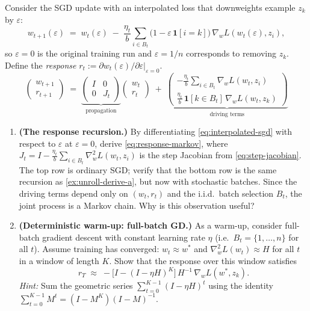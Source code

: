 \documentclass[11pt]{article}
\begin{document}
\begin{exercise}\label{ex:unroll-to-if}
Consider the SGD update with an interpolated loss that downweights example $z_k$ by $\varepsilon$:
\begin{equation}\label{eq:interpolated-sgd}
  w_{t+1}(\varepsilon) \;=\; w_t(\varepsilon) \;-\; \frac{\eta_t}{b}\sum_{i\in B_t}\bigl(1 - \varepsilon\,\mathbf{1}[i=k]\bigr)\,\nabla_w L(w_t(\varepsilon),z_i),
\end{equation}
so $\varepsilon = 0$ is the original training run and $\varepsilon = 1/n$ corresponds to removing $z_k$. Define the \emph{response} $r_t := \partial w_t(\varepsilon)/\partial\varepsilon\big|_{\varepsilon=0}$.
\begin{equation}\label{eq:response-markov}
  \begin{pmatrix} w_{t+1} \\ r_{t+1} \end{pmatrix} \;=\; \underbrace{\begin{pmatrix} I & 0 \\ 0 & J_t \end{pmatrix}}_{\text{propagation}} \begin{pmatrix} w_t \\ r_t \end{pmatrix} \;+\; \underbrace{\begin{pmatrix} -\frac{\eta_t}{b}\sum_{i\in B_t}\nabla_w L(w_t,z_i) \\[4pt] \frac{\eta_t}{b}\,\mathbf{1}[k\in B_t]\,\nabla_w L(w_t,z_k) \end{pmatrix}}_{\text{driving terms}}
\end{equation}
\begin{enumerate}
  \item \textbf{(The response recursion.)} By differentiating \eqref{eq:interpolated-sgd} with respect to $\varepsilon$ at $\varepsilon = 0$, derive \eqref{eq:response-markov}, where $J_t = I - \frac{\eta_t}{b}\sum_{i\in B_t}\nabla_w^2 L(w_t,z_i)$ is the step Jacobian from \eqref{eq:step-jacobian}. The top row is ordinary SGD; verify that the bottom row is the same recursion as \cref{ex:unroll-derive-a}, but now with stochastic batches. Since the driving terms depend only on $(w_t, r_t)$ and the i.i.d.\ batch selection $B_t$, the joint process is a Markov chain. Why is this observation useful?

  \item \textbf{(Deterministic warm-up: full-batch GD.)} As a warm-up, consider full-batch gradient descent with constant learning rate $\eta$ (i.e.\ $B_t = \{1,\dots,n\}$ for all $t$). Assume training has converged: $w_t \approx w^*$ and $\nabla_w^2 L(w_t) \approx H$ for all $t$ in a window of length $K$. Show that the response over this window satisfies
  \[
    r_T \;\approx\; -\bigl[I - (I-\eta H)^K\bigr]\,H^{-1}\,\nabla_w L(w^*,z_k).
  \]
  \emph{Hint:} Sum the geometric series $\sum_{t=0}^{K-1}(I-\eta H)^t$ using the identity $\sum_{t=0}^{K-1}M^t = (I-M^K)(I-M)^{-1}$.


\end{enumerate}
\end{exercise}
\end{document}
